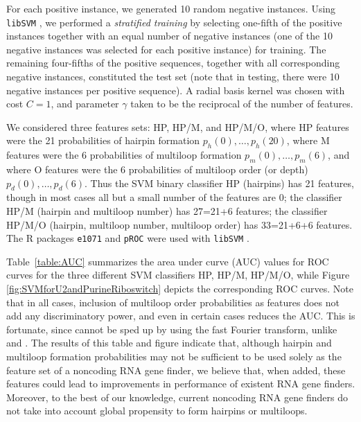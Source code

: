 For each positive instance, we generated 10 random negative instances.
Using {\tt libSVM} \citep{libSVM}, we performed a {\em stratified training}
by selecting one-fifth of the
positive instances together with an equal number of negative instances
(one of the 10 negative instances was selected for each positive instance)
for training. The remaining four-fifths of the positive sequences, together
with all corresponding negative instances, constituted the test set
(note that in testing, there were 10 negative instances per positive sequence).
A radial basis kernel was chosen with cost $C=1$, and parameter $\gamma$
taken to be the reciprocal of the number of features.

We considered three features sets: HP, HP/M, and HP/M/O,
where HP features were the 21 probabilities of hairpin formation
$p_h(0),\ldots,p_h(20)$, where M features were the 6 probabilities of
multiloop formation $p_m(0),\ldots,p_m(6)$, and where O features
were the 6 probabilities of multiloop order (or depth) $p_d(0),\ldots,p_d(6)$.
Thus the SVM binary classifier HP (hairpins) has 21 features, though in
most cases all but a small number of the features are $0$;
the classifier HP/M (hairpin and multiloop number) has
27=21+6 features; the classifier HP/M/O (hairpin, multiloop number,
multiloop order) has 33=21+6+6 features.
The R packages {\tt e1071} \citep{RpackageForSVM} and {\tt pROC} \citep{pROC}
were used with {\tt libSVM} \citep{libSVM}.

Table~\ref{table:AUC} summarizes the area under curve (AUC) values for
ROC curves for the three different SVM classifiers HP, HP/M, HP/M/O,
while Figure \ref{fig:SVMforU2andPurineRiboswitch} depicts the corresponding
ROC curves. Note that in all cases, inclusion of multiloop order probabilities
as features does not add any discriminatory power, and even in certain cases
reduces the AUC. This is fortunate, since {\rnamlorder} cannot be
sped up by using the fast Fourier transform, unlike {\rnahairpin} and
{\rnamlnumber}. The results of this table and figure indicate that,
although hairpin and multiloop formation probabilities may not be
sufficient to be used solely as the feature set of a noncoding RNA gene
finder, we believe that, when added, these features could lead to improvements
in performance of existent RNA gene finders. Moreover, to the best of our
knowledge, current noncoding RNA gene finders do not take into account
global propensity to form hairpins or multiloops.

